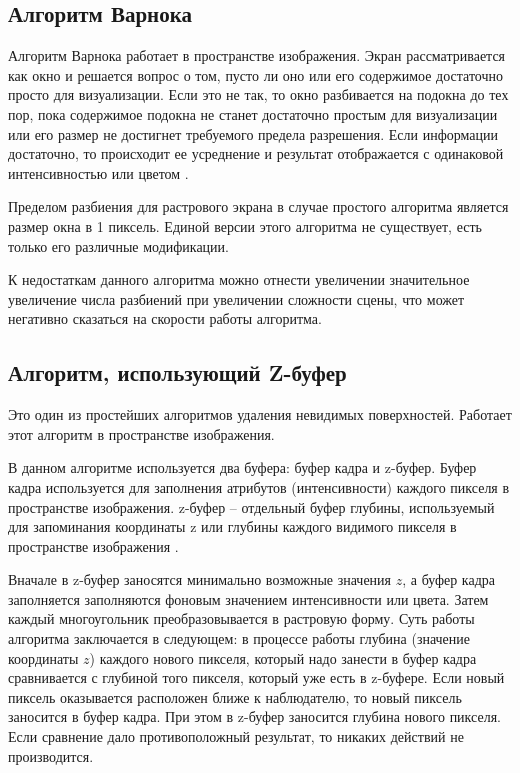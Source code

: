 \subsection{Алгоритм Варнока}

Алгоритм Варнока работает в пространстве изображения. Экран
рассматривается как окно и решается вопрос о том, пусто ли оно или его
содержимое достаточно просто для визуализации. Если это не так, то окно
разбивается на подокна до тех пор, пока содержимое подокна не станет
достаточно простым для визуализации или его размер не достигнет требуемого 
предела разрешения. Если информации достаточно, то происходит ее усреднение
и результат отображается с одинаковой интенсивностью или цветом \cite{rodjers}.

Пределом разбиения для растрового экрана в случае простого алгоритма
является размер окна в 1 пиксель. Единой версии этого алгоритма не существует,
есть только его различные модификации.

К недостаткам данного алгоритма можно отнести увеличении значительное увеличение числа разбиений при увеличении сложности сцены, что может негативно сказаться на скорости работы алгоритма.

\subsection{Алгоритм, использующий Z-буфер}

Это один из простейших алгоритмов удаления невидимых поверхностей. Работает этот алгоритм в пространстве изображения\cite{rodjers}. 

В данном алгоритме используется два буфера: буфер кадра и z-буфер. Буфер кадра используется для заполнения атрибутов (интенсивности) каждого пикселя в пространстве изображения. z-буфер -- отдельный буфер глубины, используемый для запоминания координаты z или глубины каждого видимого пикселя в пространстве изображения \cite{rodjers}.

Вначале в z-буфер заносятся минимально возможные значения $z$, а буфер
кадра заполняется заполняются фоновым значением интенсивности или цвета.
Затем каждый многоугольник преобразовывается в растровую форму. Суть 
работы алгоритма заключается в следующем: в процессе работы глубина
(значение координаты $z$) каждого нового пикселя, который надо занести в буфер
кадра сравнивается с глубиной того пикселя, который уже есть в z-буфере. Если
новый пиксель оказывается расположен ближе к наблюдателю, то новый пиксель
заносится в буфер кадра. При этом в z-буфер заносится глубина нового пикселя.
Если сравнение дало противоположный результат, то никаких действий не
производится. 

